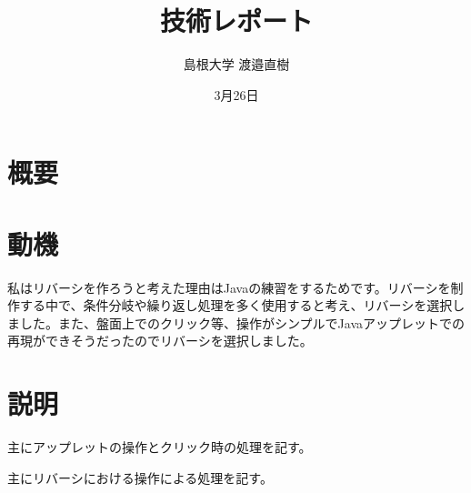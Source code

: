 \documentclass[10.5pt, a4paper]{jsarticle}
\title{技術レポート}
\author{島根大学 渡邉直樹}
\date{3月26日}
\begin{document}
\maketitle

\section{概要}

\section{動機}
私はリバーシを作ろうと考えた理由はJavaの練習をするためです。リバーシを制作する中で、条件分岐や繰り返し処理を多く使用すると考え、リバーシを選択しました。また、盤面上でのクリック等、操作がシンプルでJavaアップレットでの再現ができそうだったのでリバーシを選択しました。

\section{説明}
主にアップレットの操作とクリック時の処理を記す。

主にリバーシにおける操作による処理を記す。
\end{document}
